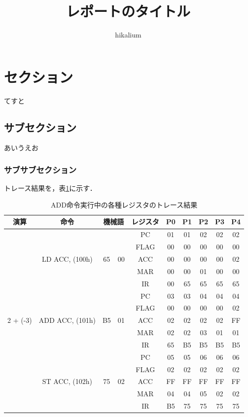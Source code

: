 


\title{レポートのタイトル}
\author{hikalium}
\maketitle
\thispagestyle{fancy}

\section{セクション}
てすと
\subsection{サブセクション}
あいうえお
\subsubsection{サブサブセクション}
トレース結果を，表\ref{addtrace}に示す．

\begin{table}[htb]
\caption{ADD命令実行中の各種レジスタのトレース結果}
\begin{center}
\begin{tabular}
{c|c|c|c|c|c|c|c|c|c}
\hline
演算 & 命令 & \multicolumn{2}{c|}{機械語} & レジスタ & P0 & P1 & P2 & P3 & P4  \\ \hline

\multirow{15}{*}{2 + (-3)}&
\multirow{5}{*}{LD ACC, (100h)}&
\multirow{5}{*}{65} & \multirow{5}{*}{00} 
		& PC	& 01 & 01 & 02 & 02 & 02 \\
& & &	& FLAG	& 00 & 00 & 00 & 00 & 00 \\
& & &	& ACC	& 00 & 00 & 00 & 00 & 02 \\
& & &	& MAR	& 00 & 00 & 01 & 00 & 00 \\
& & &	& IR	& 00 & 65 & 65 & 65 & 65 \\
\cline{2-10}

&
\multirow{5}{*}{ADD ACC, (101h)}&
\multirow{5}{*}{B5} & \multirow{5}{*}{01} 
		& PC	& 03 & 03 & 04 & 04 & 04 \\
& & &	& FLAG	& 00 & 00 & 00 & 00 & 02 \\
& & &	& ACC	& 02 & 02 & 02 & 02 & FF \\
& & &	& MAR	& 02 & 02 & 03 & 01 & 01 \\
& & &	& IR	& 65 & B5 & B5 & B5 & B5 \\
\cline{2-10}

&
\multirow{5}{*}{ST ACC, (102h)}&
\multirow{5}{*}{75} & \multirow{5}{*}{02} 
		& PC	& 05 & 05 & 06 & 06 & 06 \\
& & &	& FLAG	& 02 & 02 & 02 & 02 & 02 \\
& & &	& ACC	& FF & FF & FF & FF & FF \\
& & &	& MAR	& 04 & 04 & 05 & 02 & 02 \\
& & &	& IR	& B5 & 75 & 75 & 75 & 75 \\
\hline

\end{tabular}
\end{center}
\label{addtrace}
\end{table}

